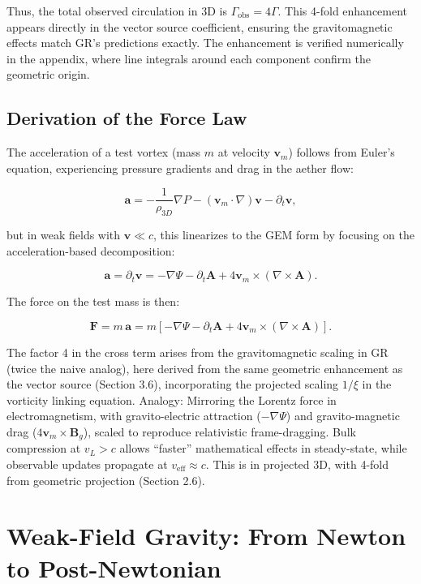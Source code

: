 \documentclass{article}
\begin{document}
Thus, the total observed circulation in 3D is $\Gamma_{\text{obs}} = 4\Gamma$. This 4-fold enhancement appears directly in the vector source coefficient, ensuring the gravitomagnetic effects match GR's predictions exactly. The enhancement is verified numerically in the appendix, where line integrals around each component confirm the geometric origin.

\subsection{Derivation of the Force Law}

The acceleration of a test vortex (mass $m$ at velocity $\mathbf{v}_m$) follows from Euler's equation, experiencing pressure gradients and drag in the aether flow:

\[
\mathbf{a} = -\frac{1}{\rho_{3D}} \nabla P - (\mathbf{v}_m \cdot \nabla) \mathbf{v} - \partial_t \mathbf{v},
\]

but in weak fields with $\mathbf{v} \ll c$, this linearizes to the GEM form by focusing on the acceleration-based decomposition:

\[
\mathbf{a} = \partial_t \mathbf{v} = -\nabla \Psi - \partial_t \mathbf{A} + 4 \mathbf{v}_m \times (\nabla \times \mathbf{A}).
\]

The force on the test mass is then:

\[
\mathbf{F} = m \, \mathbf{a} = m \left[ -\nabla \Psi - \partial_t \mathbf{A} + 4 \mathbf{v}_m \times (\nabla \times \mathbf{A}) \right].
\]

The factor 4 in the cross term arises from the gravitomagnetic scaling in GR (twice the naive analog), here derived from the same geometric enhancement as the vector source (Section 3.6), incorporating the projected scaling $1/\xi$ in the vorticity linking equation. Analogy: Mirroring the Lorentz force in electromagnetism, with gravito-electric attraction ($-\nabla \Psi$) and gravito-magnetic drag ($4 \mathbf{v}_m \times \mathbf{B}_g$), scaled to reproduce relativistic frame-dragging. Bulk compression at $v_L > c$ allows ``faster'' mathematical effects in steady-state, while observable updates propagate at $v_{\text{eff}} \approx c$. This is in projected 3D, with 4-fold from geometric projection (Section 2.6).

\section{Weak-Field Gravity: From Newton to Post-Newtonian}
\end{document}
